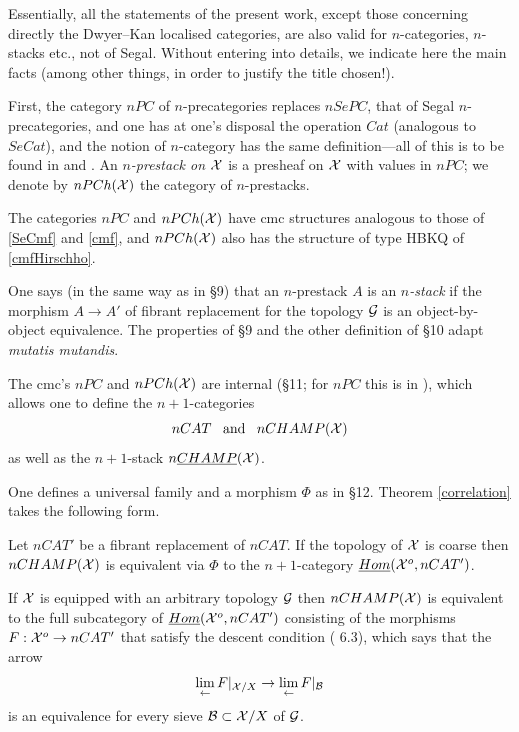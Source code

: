 
Essentially, all the statements of the
present work, except those concerning
directly the Dwyer--Kan localised categories, are also valid for
$n$-categories, $n$-stacks etc., not of Segal. Without entering into details,
we indicate here the main facts (among other things, in order to justify the
title chosen!).

First, the category $nPC$ of $n$-precategories replaces $nSePC$, that
of Segal $n$-precategories, and one has at one's disposal the operation $Cat$ (analogous to
$SeCat$), and the notion of $n$-category has the same definition---all of this
is to be found in
\cite{Tamsamani} and \cite{nCAT}.  An {\em $n$-prestack on ${\cal X}$} is a
presheaf on ${\cal X}$ with values in $nPC$; we denote by
$nPCh({\cal X} )$ the category of
$n$-prestacks.

The categories $nPC$ and $nPCh({\cal X} )$ have
cmc structures analogous to those of \ref{SeCmf} and \ref{cmf}, and
$nPCh({\cal X} )$ also has the structure of type HBKQ of \ref{cmfHirschho}.

One says (in the same way as in \S9) that an $n$-prestack $A$ is
an {\em
$n$-stack} if the morphism $A\rightarrow A'$ of fibrant replacement for the
topology ${\cal G}$ is an object-by-object equivalence. The properties of
\S9 and the other definition of \S10 adapt {\em mutatis mutandis}.

The cmc's $nPC$ and $nPCh({\cal X} )$ are internal (\S11; for $nPC$ this is in
\cite{nCAT}), which allows one to define the $n+1$-categories
$$
nCAT\;\;\; \mbox{and} \;\;\; nCHAMP({\cal X} )
$$
as well as the $n+1$-stack $n\underline{CHAMP}({\cal X} )$.

One defines a universal family and a morphism $\Phi$ as in \S12.
Theorem \ref{correlation} takes the following form.


\begin{theorem}
\label{correlationNdS}
Let $nCAT'$ be a fibrant replacement of $nCAT$.
If the topology of ${\cal X}$ is
coarse then $nCHAMP({\cal X} )$ is equivalent via $\Phi$ to the
$n+1$-category $\underline{Hom}({\cal X} ^o, nCAT')$.

If ${\cal X}$ is equipped with an arbitrary topology
${\cal G}$ then $nCHAMP({\cal X} )$ is equivalent to the full subcategory
of
$\underline{Hom}({\cal X} ^o, nCAT')$ consisting of the morphisms
$F:{\cal X} ^o\rightarrow nCAT'$ that satisfy the descent condition
(\cite{limits} 6.3), which says that the arrow
$$
\lim _{\leftarrow} F|_{{\cal X} /X} \rightarrow
\lim _{\leftarrow} F|_{{\cal B}}
$$
is an equivalence for every sieve ${\cal B} \subset {\cal X} /X$ of ${\cal G}$.
\end{theorem}
\eop

